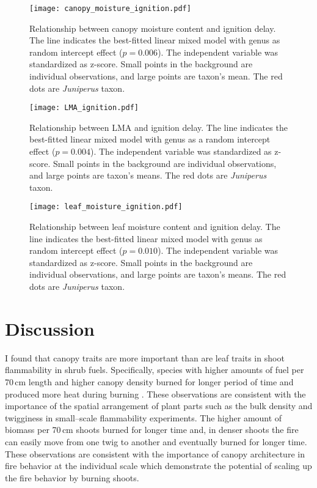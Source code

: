 \documentclass{ttuthes2007}
\begin{document}
\begin{figure}[ht]
    \centering
    \texttt{[image: canopy\_moisture\_ignition.pdf]}
    \caption{Relationship between canopy moisture content and ignition delay. The line indicates the best-fitted linear mixed model with genus as random intercept effect ($p = 0.006$). The independent variable was standardized  as z-score. Small points in the background are individual observations, and large points are taxon's mean. The red dots are \emph{Juniperus} taxon.}
    \label{fig:canopy_moisture_ig_delay}
\end{figure}

\begin{figure}[ht]
  \centering \texttt{[image: LMA\_ignition.pdf]}
  \caption{Relationship between LMA and ignition delay. The line indicates the best-fitted linear mixed model with genus as a random intercept effect ($p = 0.004$). The independent variable was standardized  as z-score. Small points in the background are individual observations, and large points are taxon's means. The red dots are \emph{Juniperus} taxon.}
  \label{fig:lma_ig_delay}
\end{figure}



\begin{figure}[ht]
  \centering \texttt{[image: leaf\_moisture\_ignition.pdf]}
  \caption{Relationship between leaf moisture content and ignition delay. The line indicates the best-fitted linear mixed model with genus as random intercept effect ($p = 0.010$). The independent variable was standardized  as z-score. Small points in the background are individual observations, and large points are taxon's means. The red dots are \emph{Juniperus} taxon.}
  \label{fig:leafmc_ig_delay}
\end{figure}



\clearpage
\section{Discussion}

I found that canopy traits are more important than are leaf traits in shoot flammability in shrub fuels. %
Specifically, species with higher amounts of fuel per 70\,cm length and higher canopy density burned for longer period of time and produced more heat during burning . These observations are consistent with the importance of the spatial arrangement of plant parts such as the bulk density \citep{pausas2012firesulex} and twigginess \citep{potts2022growth} in small--scale flammability experiments. The higher amount of biomass per 70\,cm shoots burned for longer time and, in denser shoots the fire can easily move from one twig to another and eventually burned for longer time. These observations are  consistent with the importance of canopy architecture in fire behavior at the individual scale \citep{madrigal2012evaluation} which demonstrate the potential of scaling up the fire behavior by burning shoots.
\end{document}
